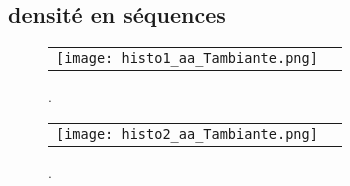     \clearpage

   \subsection{densité en séquences }

    \begin{figure}[h]
      \centering
      \begin{tabular}{cc} 
        \texttt{[image: histo1\_aa\_Tambiante.png]} &
      \end{tabular}
      
      \caption{.}
\label{graph:densité_en_séquences1}
    \end{figure}


    \begin{figure}[h]
      \centering
      \begin{tabular}{cc} 
        \texttt{[image: histo2\_aa\_Tambiante.png]} &
      \end{tabular}
      
      \caption{.}
\label{graph:densité_en_séquences2}
    \end{figure}

    \clearpage




